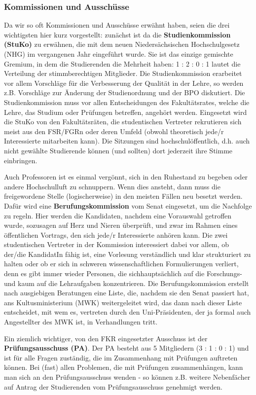 	\subsubsection*{Kommissionen und Ausschüsse}
		Da wir so oft Kommissionen und Ausschüsse erwähnt haben, seien die drei wichtigsten hier kurz vorgestellt: zunächst ist da die \textbf{Studienkommission (StuKo)} zu erwähnen, die mit dem neuen Niedersächsischen Hochschulgesetz (NHG) im vergangenen Jahr eingeführt wurde. Sie ist das einzige gemischte Gremium, in dem die Studierenden die Mehrheit haben: 1 : 2 : 0 : 1 lautet die Verteilung der stimmberechtigen Mitglieder. Die Studienkommission erarbeitet vor allem Vorschläge für die Verbesserung der Qualität in der Lehre, so werden z.B. Vorschläge zur Änderung der Studienordnung und der BPO diskutiert. Die Studienkommission muss vor allen Entscheidungen des Fakultätsrates, welche die Lehre, das Studium oder Prüfungen betreffen, angehört werden. Eingesetzt wird die StuKo von den Fakultätsräten, die studentischen Vertreter rekrutieren sich meist aus den FSR/FGRn oder deren Umfeld (obwohl theoretisch jede/r Interessierte mitarbeiten kann). Die Sitzungen sind hochschulöffentlich, d.h. auch nicht gewählte Studierende können (und sollten) dort jederzeit ihre Stimme einbringen.

		Auch Professoren ist es einmal vergönnt, sich in den Ruhestand zu begeben oder andere Hochschulluft zu schnuppern. Wenn dies ansteht, dann muss die freigewordene Stelle (logischerweise) in den meisten Fällen neu besetzt werden. Dafür wird eine \textbf{Berufungskommission} vom Senat eingesetzt, um die Nachfolge zu regeln. Hier werden die Kandidaten, nachdem eine Vorauswahl getroffen wurde, sozusagen auf Herz und Nieren überprüft, und zwar im Rahmen eines öffentlichen Vortrags, den sich jede/r Interessierte anhören kann. Die zwei studentischen Vertreter in der Kommission interessiert dabei vor allem, ob der/die KandidatIn fähig ist, eine Vorlesung verständlich und klar strukturiert zu halten oder ob er sich in schweren wissenschaftlichen Formulierungen verliert, denn es gibt immer wieder Personen, die sichhauptsächlich auf die Forschungs- und kaum auf die Lehraufgaben konzentrieren. Die Berufungskommission erstellt nach ausgiebigen Beratungen eine Liste, die, nachdem sie den Senat passiert hat, ans Kultusministerium (MWK) weitergeleitet wird, das dann nach dieser Liste entscheidet, mit wem es, vertreten durch den Uni-Präsidenten, der ja formal auch Angestellter des MWK ist, in Verhandlungen tritt.

		Ein ziemlich wichtiger, von den FKR eingesetzter Ausschuss ist der \textbf{Prüfungsausschuss (PA)}. Der PA besteht aus 5 Mitgliedern (3 : 1 : 0 : 1) und ist für alle Fragen zuständig, die im Zusammenhang mit Prüfungen auftreten können. Bei (fast) allen Problemen, die mit Prüfungen zusammenhängen, kann man sich an den Prüfungsausschuss wenden - so können z.B. weitere Nebenfächer auf Antrag der Studierenden vom Prüfungsausschuss genehmigt werden. 

